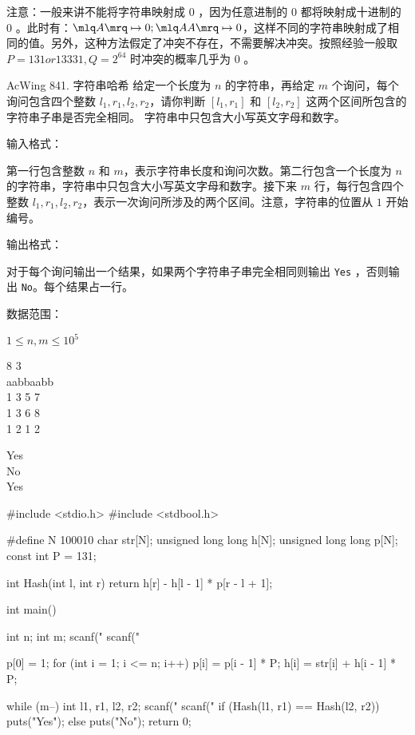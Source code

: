 注意：一般来讲不能将字符串映射成 $0$ ，因为任意进制的 $0$ 都将映射成十进制的 $0$ 。此时有：$\mlq A \mrq \mapsto 0; \mlq AA \mrq \mapsto 0$，这样不同的字符串映射成了相同的值。另外，这种方法假定了冲突不存在，不需要解决冲突。按照经验一般取 $P = 131 or 13331, Q = 2^{64}$ 时冲突的概率几乎为 $0$ 。

\begin{titledbox}{AcWing 841. 字符串哈希}
    给定一个长度为 $n$ 的字符串，再给定 $m$ 个询问，每个询问包含四个整数 $l_1, r_1, l_2, r_2$，请你判断 $[l_1, r_1]$ 和 $[l_2, r_2]$ 这两个区间所包含的字符串子串是否完全相同。
    字符串中只包含大小写英文字母和数字。

    输入格式：

    第一行包含整数 $n$ 和 $m$，表示字符串长度和询问次数。第二行包含一个长度为 $n$ 的字符串，字符串中只包含大小写英文字母和数字。接下来 $m$ 行，每行包含四个整数 $l_1, r_1, l_2, r_2$，表示一次询问所涉及的两个区间。注意，字符串的位置从 $1$ 开始编号。

    输出格式：

    对于每个询问输出一个结果，如果两个字符串子串完全相同则输出 \lstinline{Yes} ，否则输出 \lstinline{No}。每个结果占一行。

    数据范围：

    $1 \le n, m \le 10^5$

    \begin{inputblock}
        8 3 \\
        aabbaabb \\
        1 3 5 7 \\
        1 3 6 8 \\
        1 2 1 2
    \end{inputblock}
    \begin{outputblock}
        Yes \\
        No \\
        Yes
    \end{outputblock}
\end{titledbox}

\begin{mycpptwocol}[字符串前缀哈希法]
    #include <stdio.h>
    #include <stdbool.h>

    #define N 100010
    char str[N];
    unsigned long long h[N];
    unsigned long long p[N];
    const int P = 131;

    int Hash(int l, int r) {
        return h[r] - h[l - 1] * p[r - l + 1];
    }

    int main() {
        int n;
        int m;
        scanf("%
        scanf("%

        p[0] = 1;
        for (int i = 1; i <= n; i++) {
            p[i] = p[i - 1] * P;
            h[i] = str[i] + h[i - 1] * P;
        }

        while (m--) {
            int l1, r1, l2, r2;
            scanf("%
            scanf("%
            if (Hash(l1, r1) == Hash(l2, r2)) {
                puts("Yes");
            } else {
                puts("No");
            }
        }
        return 0;
    }
\end{mycpptwocol}

